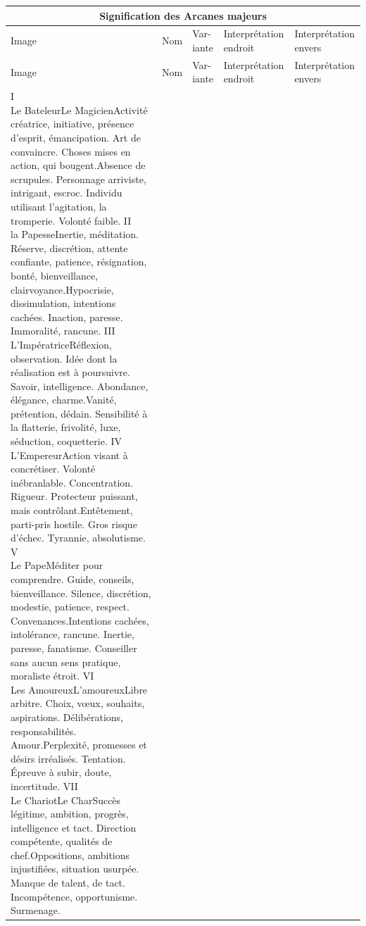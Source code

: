 {%
\setlongtables
\hspace{-5cm}\begin{longtable}{|m{1.35cm}|m{1.9cm}|m{0.5cm}|m{4.5cm}|m{4.5cm}|}
\hline \multicolumn{5}{|c|}{Signification des Arcanes majeurs}
\\ \hline Image & Nom & {\small{}Var-iante} & Interprétation endroit & Interprétation envers\\\hline
\endfirsthead
\hline Image & Nom & {\small{}Var-iante} & Interprétation endroit & Interprétation envers\\\hline
\endhead
\endfoot
\cartetarot{LeBateleur}{I \\ Le Bateleur}{Le Magicien}{Activité créatrice, initiative, présence d'esprit, émancipation. Art de convaincre. Choses mises en action, qui bougent.}{Absence de scrupules. Personnage arriviste, intrigant, escroc. Individu utilisant l'agitation, la tromperie. Volonté faible.}
\cartetarot{LaPapesse}{II \\ la Papesse}{}{Inertie, méditation. Réserve, discrétion, attente confiante, patience, résignation, bonté, bienveillance, clairvoyance.}{Hypocrisie, dissimulation, intentions cachées. Inaction, paresse. Immoralité, rancune.}
\cartetarot{LImperatrice}{III \\ L’Impératrice}{}{Réflexion, observation. Idée dont la réalisation est à poursuivre. Savoir, intelligence. Abondance, élégance, charme.}{Vanité, prétention, dédain. Sensibilité à la flatterie, frivolité, luxe, séduction, coquetterie.}
\cartetarot{LEmpereur}{IV \\ L’Empereur}{}{Action visant à concrétiser. Volonté inébranlable. Concentration. Rigueur. Protecteur puissant, mais contrôlant.}{Entêtement, parti-pris hostile. Gros risque d'échec. Tyrannie, absolutisme.}
\cartetarot{LePape}{V \\ Le Pape}{}{Méditer pour comprendre. Guide, conseils, bienveillance. Silence, discrétion, modestie, patience, respect. Convenances.}{Intentions cachées, intolérance, rancune. Inertie, paresse, fanatisme. Conseiller sans aucun sens pratique, moraliste étroit.}
\cartetarot{LesAmoureux}{VI \\ Les Amoureux}{L’amoureux}{Libre arbitre. Choix, vœux, souhaits, aspirations. Délibérations, responsabilités. Amour.}{Perplexité, promesses et désirs irréalisés. Tentation. Épreuve à subir, doute, incertitude.}
\cartetarot{LeChariot}{VII \\ Le Chariot}{Le Char}{Succès légitime, ambition, progrès, intelligence et tact. Direction compétente, qualités de chef.}{Oppositions, ambitions injustifiées, situation usurpée. Manque de talent, de tact. Incompétence, opportunisme. Surmenage.}

\end{longtable}}

